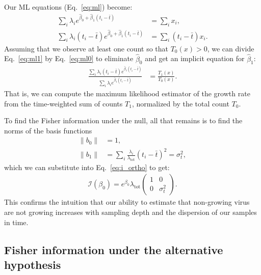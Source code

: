 \documentclass[12pt, letterpaper]{article}
\newcommand{ \lambtot }{\lambda_{\text{tot}}}
\begin{document}
Our ML equations (Eq.~\ref{eq:ml}) become:
\begin{align}
    \sum_i \lambda_i e^{\hat{\beta}_0 + \hat{\beta}_1 (t_i - \bar{t})} &= \sum_i x_i, \label{eq:ml0} \\
    \sum_i \lambda_i (t_i - \bar{t}) e^{\hat{\beta}_0 + \hat{\beta}_1 (t_i - \bar{t})} &= \sum_i (t_i - \bar{t}) x_i. \label{eq:ml1}
\end{align}
Assuming that we observe at least one count so that $T_0(x) > 0$, we can divide Eq.~\ref{eq:ml1} by Eq.~\ref{eq:ml0} to eliminate $\hat{\beta}_0$ and get an implicit equation for $\hat{\beta}_1$:
\begin{align}
    \frac{\sum_i \lambda_i (t_i - \bar{t}) e^{\hat{\beta}_1 (t_i - \bar{t})}}{\sum_i \lambda_i e^{\hat{\beta}_1 (t_i - \bar{t})}}
    &= \frac{T_1(x)}{T_0(x)}.
    \label{eq:ml_ratio}
\end{align}
That is, we can compute the maximum likelihood estimator of the growth rate from the time-weighted sum of counts $T_1$, normalized by the total count $T_0$.

To find the Fisher information under the null, all that remains is to find the norms of the basis functions
\begin{align}
    \|b_0\| &= 1, \\
    \|b_1\| &= \sum_i \frac{\lambda_i}{\lambtot} {(t_i - \bar{t})}^2 = \sigma_t^2,
\end{align}
which  we can substitute into Eq.~\ref{eq:i_ortho} to get:
\begin{align}
    \mathcal{I}(\beta_0) = e^{\beta_0} \lambtot
    \begin{pmatrix}
        1 & 0 \\
        0 & \sigma_t^2
    \end{pmatrix}.
\end{align}
This confirms the intuition that our ability to estimate that non-growing virus are not growing increases with sampling depth and the dispersion of our samples in time.

\subsection{Fisher information under the alternative hypothesis}
\end{document}

